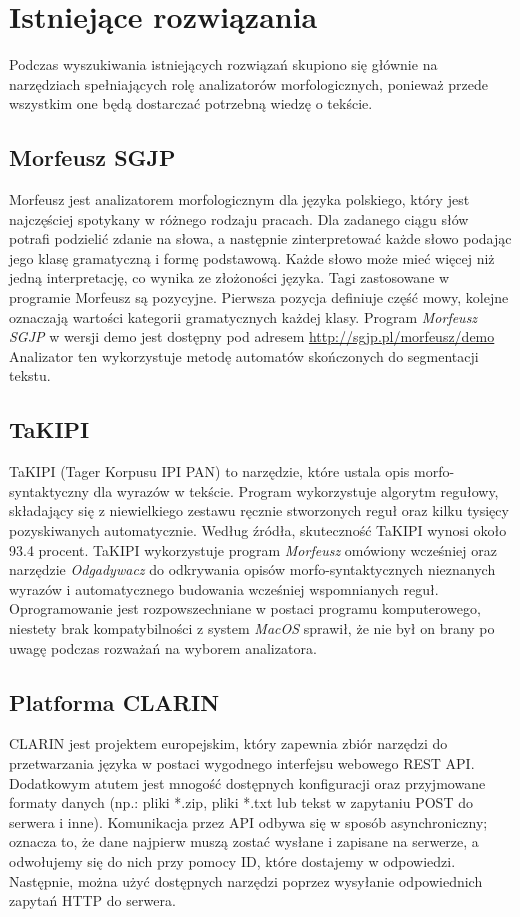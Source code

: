 \section{Istniejące rozwiązania}
Podczas wyszukiwania istniejących rozwiązań skupiono się głównie na narzędziach spełniających rolę analizatorów morfologicznych, ponieważ przede wszystkim one będą dostarczać potrzebną wiedzę o tekście. 


\subsection{Morfeusz SGJP}
Morfeusz jest analizatorem morfologicznym dla języka polskiego, który jest najczęściej spotykany w różnego rodzaju pracach. \cite{morfeusz-practical-tool} Dla zadanego ciągu słów potrafi podzielić zdanie na słowa, a następnie zinterpretować każde słowo podając jego klasę gramatyczną i formę podstawową. Każde słowo może mieć więcej niż jedną interpretację, co wynika ze złożoności języka. Tagi zastosowane w programie Morfeusz są pozycyjne. Pierwsza pozycja definiuje część mowy, kolejne oznaczają wartości kategorii gramatycznych każdej klasy. \cite{morfeusz-reference} Program \textit{Morfeusz SGJP} w wersji demo jest dostępny pod adresem \url{http://sgjp.pl/morfeusz/demo} Analizator ten wykorzystuje metodę automatów skończonych do segmentacji tekstu.

\subsection{TaKIPI}
TaKIPI (Tager Korpusu IPI PAN) to narzędzie, które ustala opis morfo-syntaktyczny dla wyrazów w tekście. Program wykorzystuje algorytm regułowy, składający się z niewielkiego zestawu ręcznie stworzonych reguł oraz kilku tysięcy pozyskiwanych automatycznie. Według źródła, skuteczność TaKIPI wynosi około 93.4 procent. \cite{takipi-polish-tagger} TaKIPI wykorzystuje program \textit{Morfeusz} omówiony wcześniej oraz narzędzie \textit{Odgadywacz} do odkrywania opisów morfo-syntaktycznych nieznanych wyrazów i automatycznego budowania wcześniej wspomnianych reguł. \cite{odgadywacz} Oprogramowanie jest rozpowszechniane w postaci programu komputerowego, niestety brak kompatybilności z system \textit{MacOS} sprawił, że nie był on brany po uwagę podczas rozważań na wyborem analizatora. \cite{takipi-polish-tagger}

\subsection{Platforma CLARIN}
CLARIN \cite{clarinMrofeusz2} jest projektem europejskim, który zapewnia zbiór narzędzi do przetwarzania języka w postaci wygodnego interfejsu webowego REST API. Dodatkowym atutem jest mnogość dostępnych konfiguracji oraz przyjmowane formaty danych (np.: pliki *.zip, pliki *.txt lub tekst w zapytaniu POST do serwera i inne). Komunikacja przez API odbywa się w sposób asynchroniczny; oznacza to, że dane najpierw muszą zostać wysłane i zapisane na serwerze, a odwołujemy się do nich przy pomocy ID, które dostajemy w odpowiedzi. Następnie, można użyć dostępnych narzędzi poprzez wysyłanie odpowiednich zapytań HTTP do serwera.

